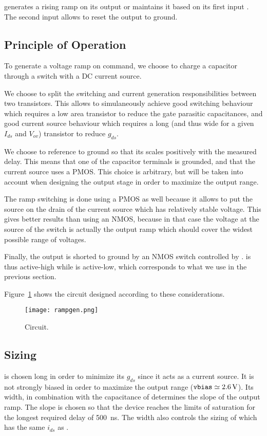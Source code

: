  generates a rising ramp on its output  or maintains it based on its first input . The second input  allows to reset the output to ground.

\subsection{Principle of Operation}
To generate a voltage ramp on command, we choose to charge a capacitor through a switch with a DC current source.

We choose to split the switching and current generation responsibilities between two transistors.
This allows to simulaneously achieve good switching behaviour which requires a low area transistor to reduce the gate parasitic capacitances, and good current source behaviour which requires a long (and thus wide for a given $I_{ds}$ and $V_{ov}$) transistor to reduce $g_{ds}$.

We choose to reference  to ground so that its scales positively with the measured delay.
This means that one of the capacitor terminals is grounded, and that the current source uses a PMOS.
This choice is arbitrary, but will be taken into account when designing the output stage in order to maximize the output range.

The ramp switching is done using a PMOS as well because it allows to put the source on the drain of the current source which has relatively stable voltage. This gives better results than using an NMOS, because in that case the voltage at the source of the switch is actually the output ramp which should cover the widest possible range of voltages.

Finally, the output is shorted to ground by an NMOS switch controlled by .  is thus active-high while  is active-low, which corresponds to what we use in the previous section.

Figure~\ref{fig:rampgen} shows the circuit designed according to these considerations.
\begin{figure}
  \centering
  \texttt{[image: rampgen.png]}
  \caption{ Circuit.\label{fig:rampgen}}
\end{figure}

\subsection{Sizing}\label{sub:rampsize}
 is chosen long in order to minimize its $g_{ds}$ since it acts as a current source.
It is not strongly biased in order to maximize the output range ($\mathtt{vbias} \simeq \SI{2.6}{\volt}$).
Its width, in combination with the capacitance of  determines the slope of the output ramp.
The slope is chosen so that the device reaches the limits of saturation for the longest required delay of \SI{500}{\nano\second}.
The width also controls the sizing of  which has the same $i_{ds}$ as .

